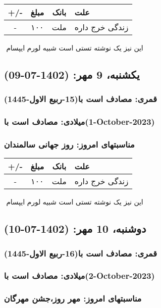 \documentclass{article}
\newcommand{\rnote}[1]{\marginpar{\textcolor{color}{\StrSubstitute{\##1}{ }{\_}}}}
\newcommand{\myRow}[4]{
    #1 & #2 & #3 & #4 \\ \hline
}
\begin{document}
\begin{tabular}{ | c | c | c | p{5cm} |}
    \hline
    \myRow{ +/- }{مبلغ}{بانک}{علت}
    \myRow{-}{۱۰۰}{ملت}{زندگی خرج داره}
\end{tabular}
\newline
\newline

‌
\rnote{تست}
این نیز یک نوشته تستی است شبیه لورم ایپسام




\newpage
{}
\textcolor{color}{
\section{ یکشنبه، 9 مهر: (1402-07-09) }
\subsubsection*{قمری: مصادف است با(15-ربیع الاول-1445)} 
\subsubsection*{میلادی: مصادف است با(1-October-2023)}
\subsubsection*{مناسبتهای امروز: روز جهانی سالمندان}
}


\begin{tabular}{ | c | c | c | p{5cm} |}
    \hline
    \myRow{ +/- }{مبلغ}{بانک}{علت}
    \myRow{-}{۱۰۰}{ملت}{زندگی خرج داره}
\end{tabular}
\newline
\newline

‌
\rnote{تست}
این نیز یک نوشته تستی است شبیه لورم ایپسام




\newpage
{}
\textcolor{color}{
\section{ دوشنبه، 10 مهر: (1402-07-10) }
\subsubsection*{قمری: مصادف است با(16-ربیع الاول-1445)} 
\subsubsection*{میلادی: مصادف است با(2-October-2023)}
\subsubsection*{مناسبتهای امروز: مهر روز،جشن مهرگان}
}
\end{document}
